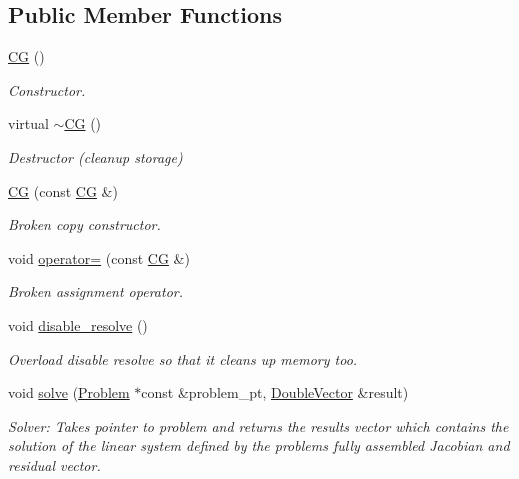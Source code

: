 \subsection*{Public Member Functions}
\begin{DoxyCompactItemize}
\item 
\hyperlink{classoomph_1_1CG_a03da73843394af90b918f2d24ee2f3a1}{CG} ()
\begin{DoxyCompactList}\small\item\em Constructor. \end{DoxyCompactList}\item 
virtual \hyperlink{classoomph_1_1CG_a35c9254d858fbc3d8f7061c1bec289c5}{$\sim$\+CG} ()
\begin{DoxyCompactList}\small\item\em Destructor (cleanup storage) \end{DoxyCompactList}\item 
\hyperlink{classoomph_1_1CG_aad7c2ce9ee38bcd3052f05460c4b4ee6}{CG} (const \hyperlink{classoomph_1_1CG}{CG} \&)
\begin{DoxyCompactList}\small\item\em Broken copy constructor. \end{DoxyCompactList}\item 
void \hyperlink{classoomph_1_1CG_ae10b7f5ed64c0f9c46976b2b5e33312f}{operator=} (const \hyperlink{classoomph_1_1CG}{CG} \&)
\begin{DoxyCompactList}\small\item\em Broken assignment operator. \end{DoxyCompactList}\item 
void \hyperlink{classoomph_1_1CG_a1116011340fabc5c5d2a97cea0cd5b72}{disable\+\_\+resolve} ()
\begin{DoxyCompactList}\small\item\em Overload disable resolve so that it cleans up memory too. \end{DoxyCompactList}\item 
void \hyperlink{classoomph_1_1CG_a3ae0fb5451136aec30defea2758c8c5d}{solve} (\hyperlink{classoomph_1_1Problem}{Problem} $\ast$const \&problem\+\_\+pt, \hyperlink{classoomph_1_1DoubleVector}{Double\+Vector} \&result)
\begin{DoxyCompactList}\small\item\em Solver\+: Takes pointer to problem and returns the results vector which contains the solution of the linear system defined by the problem\textquotesingle{}s fully assembled Jacobian and residual vector. \end{DoxyCompactList}\item 

\end{DoxyCompactItemize}
